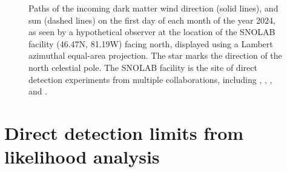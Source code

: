 \documentclass[b5paper, 10pt, twoside]{book}
\newcommand{\unitv}[1]{\symbfit{\hat{#1}}}
\begin{document}
\begin{figure}
\caption{Paths of the incoming dark matter wind direction (solid lines), and sun (dashed lines) on the first day of each month of the year 2024, as seen by a hypothetical observer at the location of the SNOLAB facility (46.47\degree N, 81.19\degree W) facing north, displayed using a Lambert azimuthal equal-area projection. The star marks the direction of the north celestial pole. The SNOLAB facility is the site of direct detection experiments from multiple collaborations, including \textcite{DEAP2016}, \textcite{PICO2016}, \textcite{SuperCDMS2017}, and \textcite{DAMIC2020}.}
\label{fig:v-lab-dir}
\end{figure}

\chapter{Direct detection limits from likelihood analysis}
\end{document}
